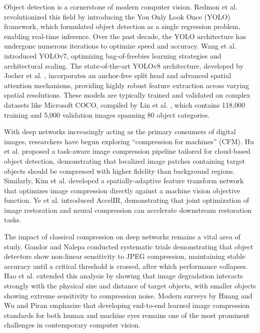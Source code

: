 \documentclass[12pt, a4paper]{article}
\begin{document}
Object detection is a cornerstone of modern computer vision. Redmon et al. \cite{redmon2016} revolutionized this field by introducing the You Only Look Once (YOLO) framework, which formulated object detection as a single regression problem, enabling real-time inference. Over the past decade, the YOLO architecture has undergone numerous iterations to optimize speed and accuracy. Wang et al. \cite{wang2023} introduced YOLOv7, optimizing bag-of-freebies learning strategies and architectural scaling. The state-of-the-art YOLOv8 architecture, developed by Jocher et al. \cite{jocher2023}, incorporates an anchor-free split head and advanced spatial attention mechanisms, providing highly robust feature extraction across varying spatial resolutions. These models are typically trained and validated on complex datasets like Microsoft COCO, compiled by Lin et al. \cite{lin2014}, which contains 118,000 training and 5,000 validation images spanning 80 object categories.

With deep networks increasingly acting as the primary consumers of digital images, researchers have begun exploring ``compression for machines'' (CFM). Hu et al. \cite{hu2018} proposed a task-aware image compression pipeline tailored for cloud-based object detection, demonstrating that localized image patches containing target objects should be compressed with higher fidelity than background regions. Similarly, Kim et al. \cite{kim2021} developed a spatially-adaptive feature transform network that optimizes image compression directly against a machine vision objective function. Ye et al. \cite{ye2023} introduced AccelIR, demonstrating that joint optimization of image restoration and neural compression can accelerate downstream restoration tasks.

The impact of classical compression on deep networks remains a vital area of study. Gandor and Nalepa \cite{gandor2022} conducted systematic trials demonstrating that object detectors show non-linear sensitivity to JPEG compression, maintaining stable accuracy until a critical threshold is crossed, after which performance collapses. Hao et al. \cite{hao2022} extended this analysis by showing that image degradation interacts strongly with the physical size and distance of target objects, with smaller objects showing extreme sensitivity to compression noise. Modern surveys by Huang and Wu \cite{huang2024} and Piran \cite{piran2022} emphasize that developing end-to-end learned image compression standards for both human and machine eyes remains one of the most prominent challenges in contemporary computer vision.
\end{document}
